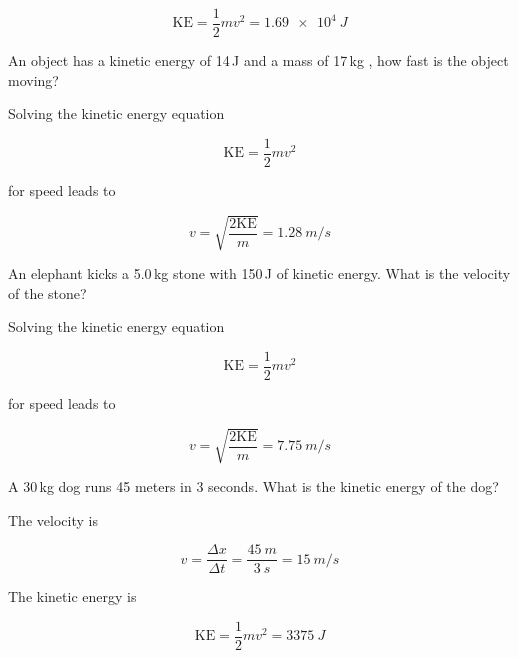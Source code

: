 \documentclass[answers]{exam}
\begin{document}
\begin{questions}
\begin{solution}
\begin{equation*}
    \mathrm{KE} = \frac{1}{2}mv^2 = \boxed{\SI{1.69e4}{J}}
\end{equation*}
\end{solution}

\question %
An object has a kinetic energy of 14\,J and a mass of 17\,kg , how fast is the object moving? 

\begin{solution}
Solving the kinetic energy equation

\begin{equation*}
    \mathrm{KE} = \frac{1}{2} mv^2
\end{equation*}

for speed leads to

\begin{equation*}
    v = \sqrt{\frac{2\mathrm{KE}}{m}} = \boxed{\SI{1.28}{m/s}}
\end{equation*}
\end{solution}

\question %
An elephant kicks a 5.0\,kg stone with 150\,J of kinetic energy. What is the velocity of the stone? 

\begin{solution}
Solving the kinetic energy equation

\begin{equation*}
    \mathrm{KE} = \frac{1}{2} mv^2
\end{equation*}

for speed leads to

\begin{equation*}
    v = \sqrt{\frac{2\mathrm{KE}}{m}} = \boxed{\SI{7.75}{m/s}}
\end{equation*}
\end{solution}

\question %
A 30\,kg dog runs 45 meters in 3 seconds. What is the kinetic energy of the dog?

\begin{solution}
The velocity is

\begin{equation*}
    v = \frac{\Delta x}{\Delta t} = \frac{\SI{45}{m}}{\SI{3}{s}} = \SI{15}{m/s}
\end{equation*}

The kinetic energy is

\begin{equation*}
    \mathrm{KE} = \frac{1}{2} m v^2 = \boxed{\SI{3375}{J}}
\end{equation*}
\end{solution}





\end{questions}
\end{document}

